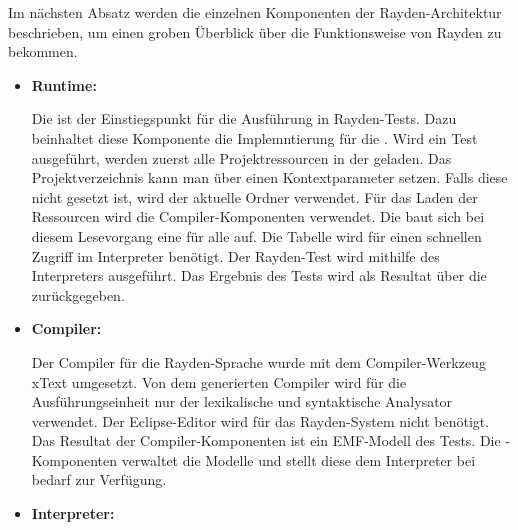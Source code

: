 \SuperPar
Im nächsten Absatz werden die einzelnen Komponenten der Rayden-Architektur beschrieben, um einen groben Überblick über die Funktionsweise von Rayden zu bekommen.\\

\begin{itemize}

\item \textbf{Runtime:}

Die  ist der Einstiegspunkt für die Ausführung in Rayden-Tests. Dazu beinhaltet diese Komponente die Implemntierung für die . Wird ein Test ausgeführt, werden zuerst alle Projektressourcen in der  geladen. Das Projektverzeichnis kann man über einen Kontextparameter setzen. Falls diese nicht gesetzt ist, wird der aktuelle Ordner verwendet. Für das Laden der Ressourcen wird die Compiler-Komponenten verwendet. Die  baut sich bei diesem Lesevorgang eine  für alle  auf. Die Tabelle wird für einen schnellen Zugriff im Interpreter benötigt. Der Rayden-Test wird mithilfe des Interpreters ausgeführt. Das Ergebnis des Tests wird als Resultat über die  zurückgegeben.\\

\item \textbf{Compiler:}

Der Compiler für die Rayden-Sprache wurde mit dem Compiler-Werkzeug xText\cite{xtext} umgesetzt. Von dem generierten Compiler wird für die Ausführungseinheit nur der lexikalische und syntaktische Analysator verwendet. Der Eclipse-Editor wird für das Rayden-System nicht benötigt. Das Resultat der Compiler-Komponenten ist ein EMF-Modell des Tests. Die -Komponenten verwaltet die Modelle und stellt diese dem Interpreter bei bedarf zur Verfügung.\\

\item \textbf{Interpreter:}


\end{itemize}
